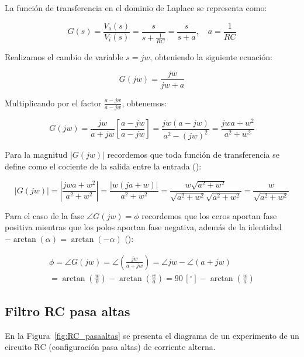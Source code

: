 \documentclass{article}
\begin{document}
La función de transferencia en el dominio de Laplace se representa como: 

\begin{equation}
    G(s) = \frac{V_o (s)}{V_i(s)} = \frac{s}{s+\frac{1}{RC}} = \frac{s}{s+a}, \quad a=\frac{1}{RC}
\end{equation}

Realizamos el cambio de variable $s = jw$, obteniendo la siguiente ecuación:

\begin{equation}
    G(jw) = \frac{jw}{jw + a}
\end{equation}

Multiplicando por el factor $\frac{a-jw}{a-jw}$, obtenemos: 

\begin{equation}
    G(jw) = \frac{jw}{a + jw}\left[\frac{a-jw}{a-jw}\right] = \frac{jw(a-jw)}{a^2-(jw)^2} = \frac{jwa+w^2}{a^2+w^2}
\end{equation}

Para la magnitud $|G(jw)|$ recordemos que toda función de transferencia se define como el cociente de la salida entre la entrada (\cite{notasclase}): 

\begin{equation}
    |G(jw)| = \left|\frac{jwa+w^2}{a^2+w^2}\right| = \frac{|w(ja+w)|}{a^2+w^2} = \frac{w\sqrt{a^2+w^2}}{\sqrt{a^2+w^2}\sqrt{a^2+w^2}} = \frac{w}{\sqrt{a^2+w^2}} 
    \label{eq:Magnitud_pa}
\end{equation}


Para el caso de la fase $\angle G(jw) = \phi$ recordemos que los ceros aportan fase positiva mientras que los polos aportan fase negativa, además de la identidad $-\arctan(\alpha) = \arctan(-\alpha)$ (\cite{notasclase}):

\begin{equation}
    \begin{aligned}
         \phi = \angle G(jw) = \angle \left(\frac{jw}{a+jw}\right) = \angle jw-\angle (a+jw) \\ = \arctan\left(\frac{w}{0}\right) -\arctan\left(\frac{w}{a}\right)= 90\,[^\circ] - \arctan \left(\frac{w}{a}\right)
        \label{eq:fase_pa}
    \end{aligned}
\end{equation}

\subsection{Filtro RC pasa altas}
En la Figura~\ref{fig:RC_pasaaltas} se presenta el diagrama de un experimento de un circuito RC (configuración pasa altas) de corriente alterna.
\end{document}

